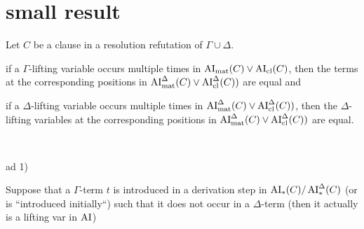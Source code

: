 \documentclass[,%
	paper=a4,%
	DIV11, %
	twoside=false,%
	liststotoc,
	bibtotoc,
	draft=false,%
	numbers=noendperiod
]{scrartcl}
\begin{document}
\section{small result}
Let $C$ be a clause in a resolution refutation of $\Gamma\cup\Delta$.

\begin{compactenum}
\item if a $\Gamma$-lifting variable occurs multiple times in $\operatorname{AI}_\mathrm{mat}(C)\lor\operatorname{AI}_\mathrm{cl}(C)$, then the terms at the corresponding positions in $\operatorname{AI}_\mathrm{mat}^\Delta(C) \lor \operatorname{AI}_\mathrm{cl}^\Delta(C))$ are equal and
\item if a $\Delta$-lifting variable occurs multiple times in $\operatorname{AI}_\mathrm{mat}^\Delta(C) \lor \operatorname{AI}_\mathrm{cl}^\Delta(C))$, then the $\Delta$-lifting variables at the corresponding positions in $\operatorname{AI}_\mathrm{mat}^\Delta(C) \lor \operatorname{AI}_\mathrm{cl}^\Delta(C))$ are equal.
\end{compactenum}

~

ad 1)

Suppose that a $\Gamma$-term $t$ is introduced in a derivation step in $\operatorname{AI}_\mathrm{*}(C)/\operatorname{AI}_\mathrm{*}^\Delta(C)$ (or is ``introduced initially``) such that it does not occur in a $\Delta$-term (then it actually is a lifting var in $\operatorname{AI}$)
\end{document}
